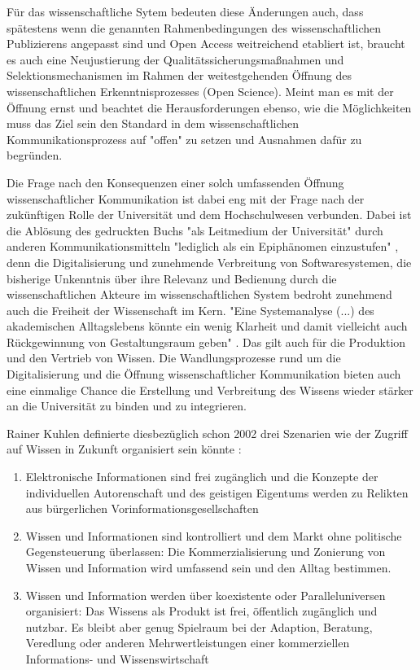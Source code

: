 Für das wissenschaftliche Sytem bedeuten diese Änderungen auch, dass spätestens wenn die genannten Rahmenbedingungen des wissenschaftlichen Publizierens angepasst sind und Open Access weitreichend etabliert ist, braucht es auch eine Neujustierung der Qualitätssicherungsmaßnahmen und Selektionsmechanismen im Rahmen der weitestgehenden Öffnung des wissenschaftlichen Erkenntnisprozesses (Open Science). Meint man es mit der Öffnung ernst und beachtet die Herausforderungen ebenso, wie die Möglichkeiten muss das Ziel sein den Standard in dem wissenschaftlichen Kommunikationsprozess auf "offen" zu setzen und Ausnahmen dafür zu begründen.

Die Frage nach den Konsequenzen einer solch umfassenden Öffnung wissenschaftlicher Kommunikation ist dabei eng mit der Frage nach der zukünftigen Rolle der Universität und dem Hochschulwesen verbunden. Dabei ist die Ablösung des gedruckten Buchs "als Leitmedium der Universität" durch anderen Kommunikationsmitteln "lediglich als ein Epiphänomen einzustufen" \cite{Warnke_2012}, denn die Digitalisierung und zunehmende Verbreitung von Softwaresystemen, die bisherige Unkenntnis über ihre Relevanz und Bedienung durch die wissenschaftlichen Akteure im wissenschaftlichen System bedroht zunehmend auch die Freiheit der Wissenschaft im Kern. "Eine Systemanalyse (...) des akademischen Alltagslebens  könnte ein wenig Klarheit und damit vielleicht auch Rückgewinnung von Gestaltungsraum geben" \cite{Warnke_2012}. Das gilt auch für die Produktion und den Vertrieb von Wissen. Die Wandlungsprozesse rund um die Digitalisierung und die Öffnung wissenschaftlicher Kommunikation bieten auch eine einmalige Chance die Erstellung und Verbreitung des Wissens wieder stärker an die Universität zu binden und zu integrieren.

Rainer Kuhlen definierte diesbezüglich schon 2002 drei Szenarien wie der Zugriff auf Wissen in Zukunft organisiert sein könnte \cite{Kuhlen_2002_universalaccess}:
\begin{enumerate}
\item Elektronische Informationen sind frei zugänglich und die Konzepte der individuellen Autorenschaft und des geistigen Eigentums werden zu Relikten aus bürgerlichen Vorinformationsgesellschaften
\item Wissen und Informationen sind kontrolliert und dem Markt ohne politische Gegensteuerung überlassen: Die Kommerzialisierung und Zonierung von Wissen und Information wird umfassend sein und den Alltag bestimmen.
\item Wissen und Information werden über koexistente oder Paralleluniversen organisiert: Das Wissens als Produkt ist frei, öffentlich zugänglich und nutzbar. Es bleibt aber genug Spielraum bei der Adaption, Beratung, Veredlung oder anderen Mehrwertleistungen einer kommerziellen Informations- und Wissenswirtschaft
\end{enumerate}

